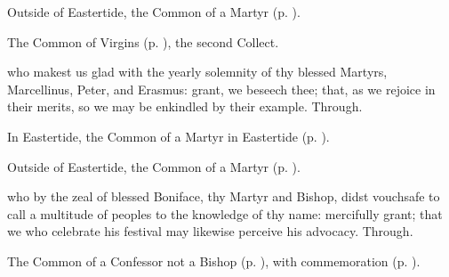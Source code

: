 \begin{rubric}
	Outside of Eastertide, the Common of a Martyr (p. \pageref{CommonMartyrBishopCollect}).
\end{rubric}



\begin{rubric}
	The Common of Virgins (p. \pageref{VirginOnlyCollect}), the second Collect.
\end{rubric}



\memorialCollect
{} who makest us glad with the yearly solemnity of thy blessed Martyrs, Marcellinus, Peter, and Erasmus: grant, we beseech thee; that, as we rejoice in their merits, so we may be enkindled by their example. Through.


\clearpage
{}

\begin{rubric}
	In Eastertide, the Common of a Martyr in Eastertide (p. \pageref{CommonMartyrEaster}).
\end{rubric}

\begin{rubric}
	Outside of Eastertide, the Common of a Martyr (p. \pageref{CommonMartyr}).
\end{rubric}

{} who by the zeal of blessed Boniface, thy Martyr and Bishop, didst vouchsafe to call a multitude of peoples to the knowledge of thy name: mercifully grant; that we who celebrate his festival may likewise perceive his advocacy. Through.




\begin{rubric}
	The Common of a Confessor not a Bishop (p. \pageref{CommonConfessorNotBishop}), with commemoration  (p. \pageref{PrimusFelician}).
\end{rubric}


\label{PrimusFelician}

